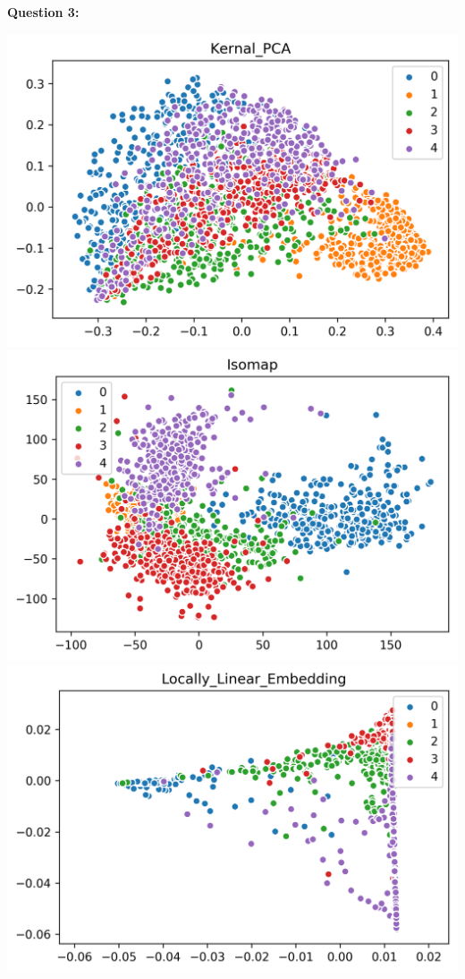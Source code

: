 \documentclass[12pt]{article}
\begin{document}
\noindent
\textbf{\large Question 3:}\\
\begin{center}
    \includegraphics[width=15cm]{Q3_Kernal_PCA.png}
    \includegraphics[width=15cm]{Q3_Isomap.png}
    \includegraphics[width=15cm]{Q3_Locally_Linear_Embedding.png}

\end{center}
\end{document}

